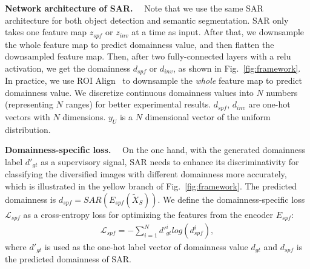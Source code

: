 \documentclass[10pt,journal,compsoc]{IEEEtran}
\renewcommand{\paragraph}[1]{\noindent\textbf{#1}~~}
\begin{document}
\paragraph{Network architecture of SAR.}
Note that we use the same SAR architecture for both object detection and semantic segmentation. SAR only takes one feature map $z_{spf}$ or $z_{inv}$ at a time as input. After that, we downsample the whole feature map to predict domainness value, and then flatten the downsampled feature map. Then, after two fully-connected layers with a relu activation, we get the domainness $d_{spf}$ or $d_{inv}$, as shown in Fig.~\ref{fig:framework}. In practice, we use ROI Align~\cite{mask-rcnn} to downsample the \emph{whole} feature map to predict domainness value.  We discretize continuous domainness values into $N$ numbers (representing $N$ ranges)  for better experimental results.
$d_{spf}$, $d_{inv}$ are one-hot vectors with $N$ dimensions. $y_{U}$ is a $N$ dimensional vector of the uniform distribution.

\paragraph{Domainness-specific loss.}
 On the one hand, with the generated domainness label $d'_{gt}$ as a supervisory signal, SAR needs to enhance its discriminativity for classifying the diversified images with different domainness more accurately, which is illustrated in the yellow branch of Fig.~\ref{fig:framework}.
The predicted domainness is $d_{spf}=SAR(E_{spf}(\tilde{X}_{S}))$.
We define the domainness-specific loss $\mathcal{L}_{spf}$ as a cross-entropy loss for optimizing the features from the encoder $E_{spf}$:
\begin{align}
\label{eq:domainness-specific}
  \mathcal{L}_{spf} = -\sum\limits_{i=1}^{N} d'^{i}_{gt} log(d^{i}_{spf}),
\end{align}
where $d'_{gt}$ is used as the one-hot label vector of domainness value $d_{gt}$ and $d_{spf}$ is the predicted domainness of SAR. 
\end{document}
